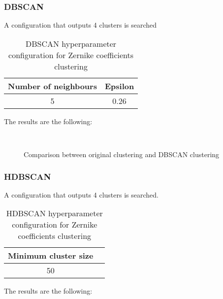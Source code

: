 		\subsubsection{DBSCAN}
			
			A configuration that outputs 4 clusters is searched
			
			\begin{table}[h!]
				\centering
				\begin{tabular}{|c|c|}
					\hline
					\textbf{Number of neighbours} & \textbf{Epsilon}\\
					\hline
					5 & 0.26\\
					\hline
				\end{tabular}
				\caption{DBSCAN hyperparameter configuration for Zernike coefficients clustering}
			\end{table}
		
			The results are the following:
			
			\begin{figure*}[ht!]
				\centering
				\hspace{\fill}
				\\
					
				\hspace{\fill}
				\caption{Comparison between original clustering and DBSCAN clustering}
			\end{figure*}
		\FloatBarrier
		
		\subsubsection{HDBSCAN}
			
			A configuration that outputs 4 clusters is searched.
			
			\begin{table}[h!]
				\centering
				\begin{tabular}{|c|c|}
					\hline
					\textbf{Minimum cluster size} \\
					\hline
					50 \\
					\hline
				\end{tabular}
				\caption{HDBSCAN hyperparameter configuration for Zernike coefficients clustering}
			\end{table}
			\FloatBarrier
			The results are the following:
			
